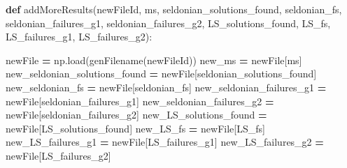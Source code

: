 \documentclass[12pt, twoside]{amherstthesis}
\newenvironment{Shaded}{\begin{snugshade}}{\end{snugshade}}
\newcommand{\KeywordTok}[1]{\textcolor[rgb]{0.13,0.29,0.53}{\textbf{#1}}}
\newcommand{\NormalTok}[1]{#1}
\newcommand{\OperatorTok}[1]{\textcolor[rgb]{0.81,0.36,0.00}{\textbf{#1}}}
\newcommand{\StringTok}[1]{\textcolor[rgb]{0.31,0.60,0.02}{#1}}
\begin{document}
\begin{Shaded}
\begin{Highlighting}[]
\KeywordTok{def}\NormalTok{ addMoreResults(newFileId, ms, seldonian\_solutions\_found, seldonian\_fs,}
\NormalTok{seldonian\_failures\_g1, seldonian\_failures\_g2, LS\_solutions\_found, LS\_fs, }
\NormalTok{LS\_failures\_g1, LS\_failures\_g2):}

\NormalTok{    newFile }\OperatorTok{=}\NormalTok{ np.load(genFilename(newFileId))}
\NormalTok{    new\_ms                        }\OperatorTok{=}\NormalTok{ newFile[}\StringTok{\textquotesingle{}ms\textquotesingle{}}\NormalTok{]}
\NormalTok{    new\_seldonian\_solutions\_found }\OperatorTok{=}\NormalTok{ newFile[}\StringTok{\textquotesingle{}seldonian\_solutions\_found\textquotesingle{}}\NormalTok{]}
\NormalTok{    new\_seldonian\_fs              }\OperatorTok{=}\NormalTok{ newFile[}\StringTok{\textquotesingle{}seldonian\_fs\textquotesingle{}}\NormalTok{]}
\NormalTok{    new\_seldonian\_failures\_g1     }\OperatorTok{=}\NormalTok{ newFile[}\StringTok{\textquotesingle{}seldonian\_failures\_g1\textquotesingle{}}\NormalTok{]}
\NormalTok{    new\_seldonian\_failures\_g2     }\OperatorTok{=}\NormalTok{ newFile[}\StringTok{\textquotesingle{}seldonian\_failures\_g2\textquotesingle{}}\NormalTok{]}
\NormalTok{    new\_LS\_solutions\_found        }\OperatorTok{=}\NormalTok{ newFile[}\StringTok{\textquotesingle{}LS\_solutions\_found\textquotesingle{}}\NormalTok{]}
\NormalTok{    new\_LS\_fs                     }\OperatorTok{=}\NormalTok{ newFile[}\StringTok{\textquotesingle{}LS\_fs\textquotesingle{}}\NormalTok{]}
\NormalTok{    new\_LS\_failures\_g1            }\OperatorTok{=}\NormalTok{ newFile[}\StringTok{\textquotesingle{}LS\_failures\_g1\textquotesingle{}}\NormalTok{]}
\NormalTok{    new\_LS\_failures\_g2            }\OperatorTok{=}\NormalTok{ newFile[}\StringTok{\textquotesingle{}LS\_failures\_g2\textquotesingle{}}\NormalTok{]}


\end{Highlighting}
\end{Shaded}
\end{document}
